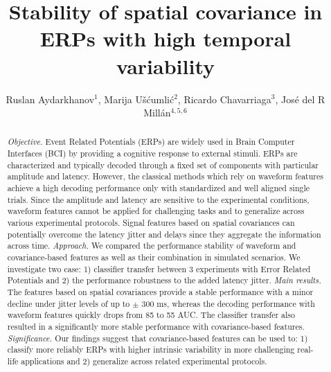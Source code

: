 \documentclass[12pt]{iopart}
\begin{document}
\title[]{Stability of spatial covariance in ERPs with high temporal variability}

\author{Ruslan Aydarkhanov$^1$,
Marija U\v{s}\'{c}umli\'{c}$^2$,
Ricardo Chavarriaga$^3$,
Jos\'e del R Mill\'an$^{4,5,6}$}


\address{$^1$Medical Image Processing Laboratory,
Center for Neuroprosthetics,
Interschool Institute of Bioengineering,
\'Ecole Polytechnique F\'ed\'erale de Lausanne (EPFL),
Campus Biotech H4,
1202 Geneva,
Switzerland}
\address{$^2$Nissan International SA,
La Pi\`ece 12,
1180 Rolle,
Switzerland
}
\address{$^3$Zurich University of Applied Sciences, ZHAW,
InIT Institut of Applied Information Technology,
Ob. Kirchgasse 2,
8400 Winterthur,
Switzerland}
\address{$^4$Dept. of Electrical and Computer Engineering,
The University of Texas at Austin,
Austin, TX 78712,
USA}
\address{$^5$Dept. of Neurology,
The University of Texas at Austin,
Austin, TX 78712,
USA}
\address{$^6$\'Ecole Polytechnique F\'ed\'erale de Lausanne (EPFL),
Campus Biotech H4,
1202 Geneva,
 Switzerland}
\vspace{10pt}

\begin{abstract}
\textit{Objective.} Event Related Potentials (ERPs) are widely used in Brain Computer
Interfaces (BCI) by providing a cognitive response to external stimuli.
ERPs are characterized and typically decoded through a fixed set of
components with particular amplitude and latency. 
However, the classical methods which rely on waveform features
achieve a high decoding performance only with standardized
and well aligned single trials. Since the amplitude and latency
are sensitive to the experimental conditions,
waveform features cannot be applied for challenging tasks and
to generalize across various experimental protocols.
Signal features based on spatial covariances can potentially overcome
the latency jitter and delays since they aggregate the information
across time.
\textit{Approach.} We compared the performance stability 
of waveform and covariance-based features as well as their combination
in simulated scenarios. We investigate two case: 1) classifier transfer 
between 3 experiments with Error Related Potentials
and 2) the performance robustness to the added latency jitter.
\textit{Main results.} The features based on spatial covariances
provide a stable performance with a minor decline
under jitter levels of up to $\pm$ 300 ms,
whereas the decoding performance with waveform features
quickly drops from 85 to 55 AUC. The classifier transfer also
resulted in a significantly more stable performance with covariance-based
features.
\textit{Significance.} Our findings suggest that covariance-based features
can be used to: 1) classify more reliably ERPs
with higher intrinsic variability in more challenging real-life applications
and 2) generalize across related experimental protocols.
\end{abstract}
\end{document}
